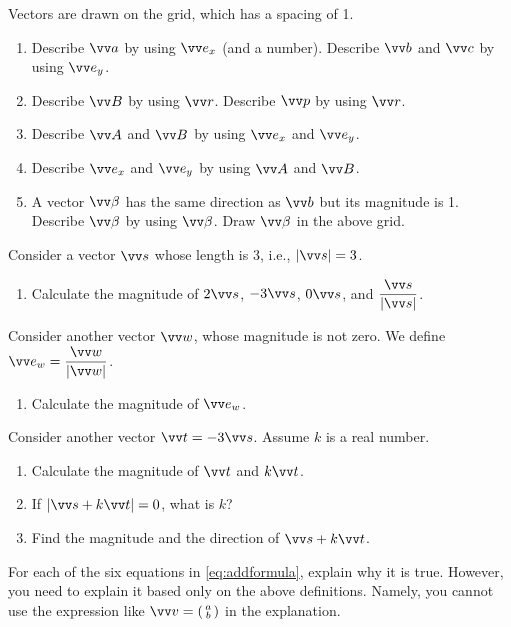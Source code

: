 \documentclass[11pt,pdfa,lastpage]{MishoNote}
\begin{document}
\begin{problems}
 \Problem[S] Vectors are drawn on the grid, which has a spacing of 1.
 \par\smallskip\par\usebox{\VectorSetA}
 \begin{enumerate}
   \item Describe $\vc a$ by using $\vvex$ (and a number).  Describe $\vc b$ and $\vc c$ by using $\vvey$.
   \item Describe $\vc B$ by using $\vc r$. Describe $\vc p$ by using $\vc r$.
   \item Describe $\vc A$ and $\vc B$ by using $\vvex$ and $\vvey$.
   \item Describe $\vvex$ and $\vvey$ by using $\vc A$ and $\vc B$.
   \item A vector $\vc \beta$ has the same direction as $\vc b$ but its magnitude is 1. Describe $\vc \beta$ by using $\vc \beta$. Draw $\vc \beta$ in the above grid.
 \end{enumerate}
\end{problems}
\begin{problems}
 \Problem[S] Consider a vector $\vc s$ whose length is 3, i.e., $|\vc s|=3$.
 \begin{enumerate}
   \item Calculate the magnitude of $2\vc s$, $-3\vc s$, $0\vc s$, and $\dfrac{\vc s}{|\vc s|}$.
 \end{enumerate}
 Consider another vector $\vc w$, whose magnitude is not zero. We define $\vc{e_w}= \dfrac{\vc w}{|\vc w|}$.
 \begin{enumerate}[resume]
  \item Calculate the magnitude of $\vc{e_w}$.
 \end{enumerate}
Consider another vector $\vc t=-3\vc s$. Assume $k$ is a real number.
\begin{enumerate}[resume]
  \item Calculate the magnitude of $\vc t$ and $k\vc t$. 
  \item If $|\vc s+k\vc t|=0$, what is $k$?
  \item Find the magnitude and the direction of $\vc s+k\vc t$.
 \end{enumerate}
 \Problem[B] For each of the six equations in \eqref{eq:addformula}, explain why it is true. However, you need to explain it based only on the above definitions. Namely, you cannot use the expression like $\vc v=\spmat{a\\b}$ in the explanation.
\end{problems}
\end{document}
